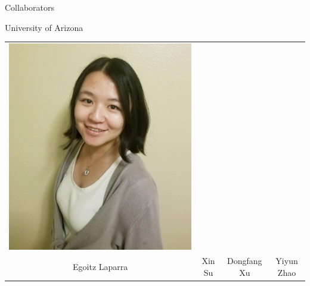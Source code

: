\documentclass[14pt]{beamer}
\begin{document}
\begin{frame}{Collaborators}
\begin{block}{University of Arizona}
\begin{tabular}{c c c c }
\includegraphics[height=0.2\textheight]{Yiyun.jpg} \\
Egoitz Laparra & Xin Su & Dongfang Xu & Yiyun Zhao
\end{tabular}
\end{block}


\end{frame}
\end{document}
